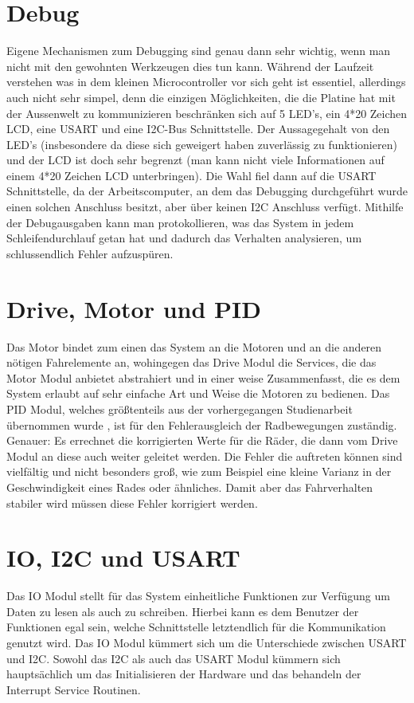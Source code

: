 \section{Debug}
Eigene Mechanismen zum Debugging sind genau dann sehr wichtig, wenn man nicht mit den
gewohnten Werkzeugen dies tun kann. Während der Laufzeit verstehen was in dem kleinen
Microcontroller vor sich geht ist essentiel, allerdings auch nicht sehr simpel, denn
die einzigen Möglichkeiten, die die Platine hat mit der Aussenwelt zu kommunizieren
beschränken sich auf 5 LED's, ein 4*20 Zeichen LCD, eine USART und eine I2C-Bus 
Schnittstelle. Der Aussagegehalt von den LED's (insbesondere da diese sich geweigert
haben zuverlässig zu funktionieren) und der LCD ist doch sehr begrenzt (man kann nicht
viele Informationen auf einem 4*20 Zeichen LCD unterbringen). Die Wahl fiel dann auf
die USART Schnittstelle, da der Arbeitscomputer, an dem das Debugging durchgeführt wurde
einen solchen Anschluss besitzt, aber über keinen I2C Anschluss verfügt.
Mithilfe der Debugausgaben kann man protokollieren, was das System in jedem
Schleifendurchlauf getan hat und dadurch das Verhalten analysieren, um schlussendlich
Fehler aufzuspüren. 
\section{Drive, Motor und PID}
Das Motor bindet zum einen das System an die Motoren und an die anderen nötigen
Fahrelemente an, wohingegen das Drive Modul die Services, die das Motor Modul anbietet
abstrahiert und in einer weise Zusammenfasst, die es dem System erlaubt auf sehr einfache
Art und Weise die Motoren zu bedienen.
Das PID Modul, welches größtenteils aus der vorhergegangen Studienarbeit übernommen wurde
\cite{STUD_TIMO}, ist für den Fehlerausgleich der Radbewegungen zuständig. Genauer: Es
errechnet die korrigierten Werte für die Räder, die dann vom Drive Modul an diese auch
weiter geleitet werden. Die Fehler die auftreten können sind vielfältig und nicht besonders
groß, wie zum Beispiel eine kleine Varianz in der Geschwindigkeit eines Rades oder ähnliches.
Damit aber das Fahrverhalten stabiler wird müssen diese Fehler korrigiert werden.
\section{IO, I2C und USART}
Das IO Modul stellt für das System einheitliche Funktionen zur Verfügung um Daten zu lesen als
auch zu schreiben. Hierbei kann es dem Benutzer der Funktionen egal sein, welche Schnittstelle
letztendlich für die Kommunikation genutzt wird. Das IO Modul kümmert sich um die Unterschiede
zwischen USART und I2C.
Sowohl das I2C als auch das USART Modul kümmern sich hauptsächlich um das Initialisieren der
Hardware und das behandeln der Interrupt Service Routinen.
